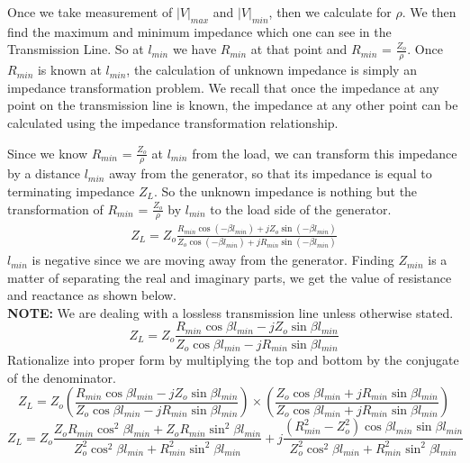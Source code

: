 Once we take measurement of $|V|_{max}$ and $|V|_{min}$, then we calculate for $ \rho $. We then find the maximum and minimum impedance which one can see in the Transmission Line. So at $l_{min}$ we have $R_{min}$ at that point and $R_{min}$ = $\frac{Z_o}{\rho}$. Once $R_{min}$ is known at $l_{min}$, the calculation of unknown impedance is simply an impedance transformation problem. We recall that once the impedance at any point on the transmission line is known, the impedance at any other point can be calculated using the impedance transformation relationship.

Since we know $R_{min}$ = $\frac{Z_o}{\rho}$ at $l_{min}$ from the load, we can transform this impedance by a distance $l_{min}$ away from the generator, so that its impedance is equal to terminating impedance $Z_{L}$. So the unknown impedance is nothing but the transformation of $R_{min}$ = $\frac{Z_o}{\rho}$ by $l_{min}$ to the load side of the generator. 
\begin{align}
Z_{L} = Z_o\frac{R_{min}\cos(-\beta l_{min}) + jZ_o\sin(-\beta l_{min})}{Z_o\cos(-\beta l_{min}) + jR_{min}\sin(-\beta l_{min})}
\end{align}
$l_{min}$ is negative since we are moving away from the generator. Finding $Z_{min}$ is a matter of separating the real and imaginary parts, we get the value of resistance and reactance as shown below.\\
\textbf{NOTE:} We are dealing with a lossless transmission line unless otherwise stated.
\begin{dmath}
Z_{L} = Z_o\frac{R_{min}\cos\beta l_{min} - jZ_o\sin\beta l_{min}}{Z_o\cos\beta l_{min} - jR_{min}\sin\beta l_{min}}
\end{dmath}
Rationalize into proper form by multiplying the top and bottom by the conjugate of the denominator.
{\footnotesize 
\begin{dmath}
Z_{L} = Z_o\left(\frac{R_{min}\cos\beta l_{min} - jZ_o\sin\beta l_{min}}{Z_o\cos\beta l_{min} - jR_{min}\sin\beta l_{min}}\right)\times\left(\frac{Z_o\cos\beta l_{min} + jR_{min}\sin\beta l_{min}}{Z_o\cos\beta l_{min} + jR_{min}\sin\beta l_{min}}\right)
\end{dmath}} 
{\footnotesize 
\begin{dmath}
Z_{L} = Z_o
\frac{Z_oR_{min}\cos^{2}\beta l_{min} + Z_oR_{min}\sin^{2}\beta l_{min}}{Z_o^{2}\cos^{2}\beta l_{min} + R_{min}^{2}\sin^{2}\beta l_{min}} +j\frac{(R_{min}^{2}-Z_o^{2})\cos\beta l_{min}\sin\beta l_{min}}{Z_o^{2}\cos^{2}\beta l_{min} + R_{min}^{2}\sin^{2}\beta l_{min}}
\end{dmath}}
